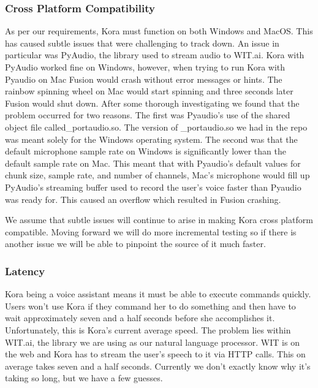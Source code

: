 \documentclass[onecolumn, draftclsnofoot,10pt, compsoc]{IEEEtran}
\begin{document}
	    \subsubsection{Cross Platform Compatibility}
		    As per our requirements, Kora must function on both Windows and MacOS.
		    This has caused subtle issues that were challenging to track down.
		    An issue in particular was PyAudio, the library used to stream audio to WIT.ai.
		    Kora with PyAudio worked fine on Windows, however, when trying to run Kora with Pyaudio on Mac Fusion would crash without error messages or hints.
		    The rainbow spinning wheel on Mac would start spinning and three seconds later Fusion would shut down.
		    After some thorough investigating we found that the problem occurred for two reasons.
		    The first was Pyaudio's use of the shared object file called\_portaudio.so.
		    The version of \_portaudio.so we had in the repo was meant solely for the Windows operating system.
		   	The second was that the default microphone sample rate on Windows is significantly lower than the default sample rate on Mac.
		   	This meant that with Pyaudio's default values for chunk size, sample rate, and number of channels, Mac's microphone would fill up PyAudio's streaming buffer used to record the user's voice faster than Pyaudio was ready for.
		    This caused an overflow which resulted in Fusion crashing.
		    
		    We assume that subtle issues will continue to arise in making Kora cross platform compatible.
		    Moving forward we will do more incremental testing so if there is another issue we will be able to pinpoint the source of it much faster. 
	    
	    \subsubsection{Latency}
		    Kora being a voice assistant means it must be able to execute commands quickly.
		    Users won't use Kora if they command her to do something and then have to wait approximately seven and a half seconds before she accomplishes it.
		    Unfortunately, this is Kora's current average speed.
		    The problem lies within WIT.ai, the library we are using as our natural language processor.
		    WIT is on the web and Kora has to stream the user's speech to it via HTTP calls.
		    This on average takes seven and a half seconds.
		    Currently we don't exactly know why it's taking so long, but we have a few guesses.
		    
\end{document}
